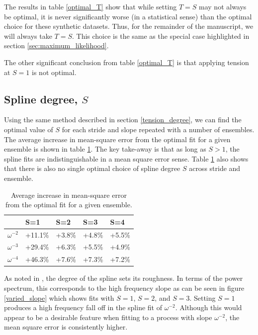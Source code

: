 \documentclass[10pt,journal]{IEEEtran}
\begin{document}
The results in table \ref{optimal_T} show that while setting $T=S$ may not always be optimal, it is never significantly worse (in a statistical sense) than the optimal choice for these synthetic datasets. Thus, for the remainder of the manuscript, we will always take $T=S$. This choice is the same as the special case highlighted in section \ref{sec:maximum_likelihood}.

The other significant conclusion from table \ref{optimal_T} is that applying tension at $S=1$ is not optimal.

\subsection{Spline degree, $S$} \label{spline_degree}

Using the same method described in section \ref{tension_degree}, we can find the optimal value of $S$ for each stride and slope repeated with a number of ensembles. The average increase in mean-square error from the optimal fit for a given ensemble is shown in table \ref{optimal_S}. The key take-away is that as long as $S > 1$, the spline fits are indistinguishable in a mean square error sense. Table \ref{optimal_S} also shows that there is also no single optimal choice of spline degree $S$ across stride and ensemble.

\begin{table}[ht]
\caption{Average increase in mean-square error from the optimal fit for a given ensemble.}
\label{optimal_S}
\centering
\begin{tabular}{r | llll}  & S=1 & S=2 & S=3 & S=4 \\ \hline \hline 
$\omega^{-2}$ & +11.1\% & +3.8\% & +4.8\% & +5.5\%  \\ 
$\omega^{-3}$ & +29.4\% & +6.3\% & +5.5\% & +4.9\%  \\ 
$\omega^{-4}$ & +46.3\% & +7.6\% & +7.3\% & +7.2\%  \\ 
\end{tabular} 
\end{table}

As noted in \cite{craven1979-nm}, the degree of the spline sets its roughness. In terms of the power spectrum, this corresponds to the high frequency slope as can be seen in figure \ref{varied_slope} which shows fits with $S=1$, $S=2$, and $S=3$. Setting $S=1$ produces a high frequency fall off in the spline fit of $\omega^{-2}$. Although this would appear to be a desirable feature when fitting to a process with slope $\omega^{-2}$, the mean square error is consistently higher.
\end{document}
